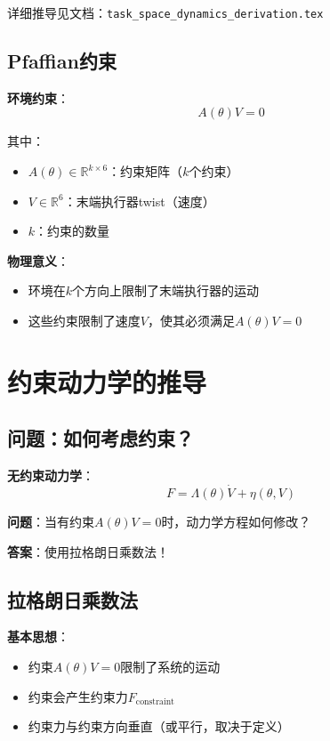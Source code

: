 \documentclass[12pt,a4paper]{article}
\begin{document}
详细推导见文档：\texttt{task\_space\_dynamics\_derivation.tex}

\subsection{Pfaffian约束}

\textbf{环境约束}：
\begin{equation}
A(\theta)V = 0 \tag{11.54}
\end{equation}

其中：
\begin{itemize}
\item $A(\theta) \in \mathbb{R}^{k \times 6}$：约束矩阵（$k$个约束）
\item $V \in \mathbb{R}^6$：末端执行器twist（速度）
\item $k$：约束的数量
\end{itemize}

\textbf{物理意义}：
\begin{itemize}
\item 环境在$k$个方向上限制了末端执行器的运动
\item 这些约束限制了速度$V$，使其必须满足$A(\theta)V = 0$
\end{itemize}

\section{约束动力学的推导}

\subsection{问题：如何考虑约束？}

\textbf{无约束动力学}：
\begin{equation}
F = \Lambda(\theta)\dot{V} + \eta(\theta, V)
\end{equation}

\textbf{问题}：当有约束$A(\theta)V = 0$时，动力学方程如何修改？

\textbf{答案}：使用拉格朗日乘数法！

\subsection{拉格朗日乘数法}

\textbf{基本思想}：
\begin{itemize}
\item 约束$A(\theta)V = 0$限制了系统的运动
\item 约束会产生约束力$F_{\text{constraint}}$
\item 约束力与约束方向垂直（或平行，取决于定义）
\end{itemize}
\end{document}
